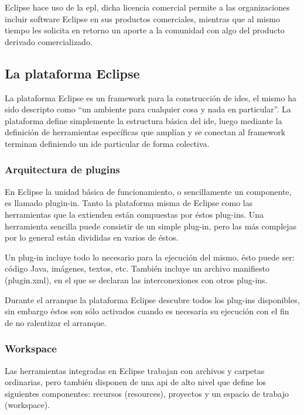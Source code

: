 \documentclass[a4paper,12pt,oneside,spanish]{book}
\begin{document}
Eclipse hace uso de la \gls{epl}, dicha licencia comercial permite a las organizaciones incluir software Eclipse en sus productos comerciales, mientras que al mismo tiempo les solicita en retorno un aporte a la comunidad con algo del producto derivado comercializado.


\subsection{La plataforma Eclipse}
\label{subsec:PlatEclipse}

La plataforma Eclipse es un framework para la construcción de \glspl{ide}, el mismo ha sido descripto como ``un ambiente para cualquier cosa y nada en particular''. La plataforma define simplemente la estructura básica del \gls{ide}, luego mediante la definición de herramientas específicas que amplían y se conectan al framework terminan definiendo un \gls{ide} particular de forma colectiva.


\subsubsection{Arquitectura de plugins}

En Eclipse la unidad básica de funcionamiento, o sencillamente un componente, es llamado plugin-in. Tanto la plataforma misma de Eclipse como las herramientas que la extienden están compuestas por éstos plug-ins. Una herramienta sencilla puede consistir de un simple plug-in, pero las más complejas por lo general están divididas en varios de éstos.

Un plug-in incluye todo lo necesario para la ejecución del mismo, ésto puede ser: código Java, imágenes, textos, etc. También incluye un archivo manifiesto (plugin.xml), en el que se declaran las interconexiones con otros plug-ins.

Durante el arranque la plataforma Eclipse descubre todos los plug-ins disponibles, sin embargo éstos son sólo activados cuando es necesaria su ejecución con el fin de no ralentizar el arranque.


\subsubsection{Workspace}

Las herramientas integradas en Eclipse trabajan con archivos y carpetas ordinarias, pero también disponen de una \gls{api} de alto nivel que define los siguientes componentes: recursos (resources), proyectos y un espacio de trabajo (workspace).
\end{document}
